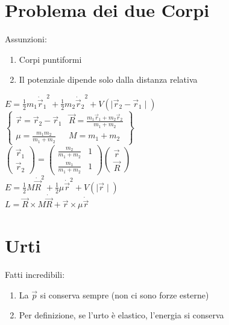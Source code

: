 \documentclass[a4paper,NoNotes,GeneralMath,12pt]{stdmdoc}
\begin{document}
	\section*{Problema dei due Corpi}
	Assunzioni: 
	\begin{enumerate}
		\item Corpi puntiformi
		\item Il potenziale dipende solo dalla distanza relativa
	\end{enumerate}
	$E = \frac{1}{2} m_1 {\dot{\vec{r}}_1}^2 + \frac{1}{2} m_2 {\dot{\vec{r}}_2}^2 + V \left( \mid \vec{r}_2 - \vec{r}_1 \mid \right)$ \\ $\left\{ \begin{array}{cc} \vec{r} = \vec{r}_2 - \vec{r}_1 & \vec{R} = \frac{m_1 \vec{r}_1 + m_2 \vec{r}_2}{m_1 + m_2} \\ \mu = \frac{m_1 m_2}{m_1 + m_2} & M = m_1 + m_2 \end{array} \right\}$ \\ $\left( \begin{array}{c} \vec{r}_1 \\ \vec{r}_2 \end{array} \right) = \left( \begin{array}{cc} \frac{m_2}{m_1 + m_2} & 1 \\ \frac{m_1}{m_1 + m_2} & 1 \end{array} \right) \left( \begin{array}{c} \vec{r} \\ \vec{R} \end{array} \right)$ \\
	$E = \frac{1}{2} M {\dot{\vec{R}}}^2 + \frac{1}{2} \mu {\dot{\vec{r}}}^2 + V \left( \mid \vec{r} \mid \right)$ \\ $L = \vec{R} \times M \dot{\vec{R}} + \vec{r} \times \mu \dot{\vec{r}}$

	\section*{Urti}

	Fatti incredibili:
	\begin{enumerate}
		\item La $\vec{p}$ si conserva sempre (non ci sono forze esterne)
		\item Per definizione, se l'urto è elastico, l'energia si conserva
	\end{enumerate}
\end{document}
